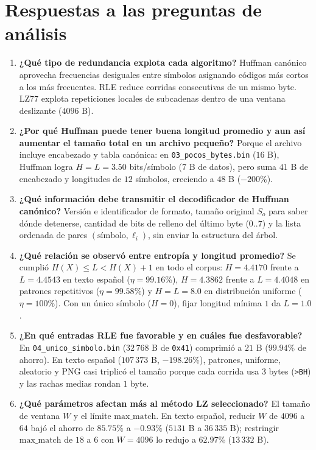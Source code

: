 \section{Respuestas a las preguntas de análisis}
\begin{enumerate}
\setlength{\itemsep}{.22em}
\item \textbf{¿Qué tipo de redundancia explota cada algoritmo?}
Huffman canónico aprovecha frecuencias desiguales entre símbolos asignando códigos más cortos a los más frecuentes. RLE reduce corridas consecutivas de un mismo byte. LZ77 explota repeticiones locales de subcadenas dentro de una ventana deslizante ($4096$ B).

\item \textbf{¿Por qué Huffman puede tener buena longitud promedio y aun así aumentar el tamaño total en un archivo pequeño?}
Porque el archivo incluye encabezado y tabla canónica: en \texttt{03\_pocos\_bytes.bin} ($16$ B), Huffman logra $H=L=3.50$ bits/símbolo ($7$ B de datos), pero suma $41$ B de encabezado y longitudes de $12$ símbolos, creciendo a $48$ B ($-200$\%).

\item \textbf{¿Qué información debe transmitir el decodificador de Huffman canónico?}
Versión e identificador de formato, tamaño original $S_o$ para saber dónde detenerse, cantidad de bits de relleno del último byte ($0..7$) y la lista ordenada de pares $(\text{símbolo},\ell_i)$, sin enviar la estructura del árbol.

\item \textbf{¿Qué relación se observó entre entropía y longitud promedio?}
Se cumplió $H(X) \le L < H(X)+1$ en todo el corpus: $H=4.4170$ frente a $L=4.4543$ en texto español ($\eta=99.16$\%), $H=4.3862$ frente a $L=4.4048$ en patrones repetitivos ($\eta=99.58$\%) y $H=L=8.0$ en distribución uniforme ($\eta=100$\%). Con un único símbolo ($H=0$), fijar longitud mínima $1$ da $L=1.0$.

\item \textbf{¿En qué entradas RLE fue favorable y en cuáles fue desfavorable?}
En \texttt{04\_unico\_simbolo.bin} ($32\,768$ B de \texttt{0x41}) comprimió a $21$ B ($99.94$\% de ahorro). En texto español ($107\,373$ B, $-198.26$\%), patrones, uniforme, aleatorio y PNG casi triplicó el tamaño porque cada corrida usa $3$ bytes (\texttt{>BH}) y las rachas medias rondan $1$ byte.

\item \textbf{¿Qué parámetros afectan más al método LZ seleccionado?}
El tamaño de ventana $W$ y el límite $\text{max\_match}$. En texto español, reducir $W$ de $4096$ a $64$ bajó el ahorro de $85.75$\% a $-0.93$\% ($5131$ B a $36\,335$ B); restringir $\text{max\_match}$ de $18$ a $6$ con $W=4096$ lo redujo a $62.97$\% ($13\,332$ B).


\end{enumerate}
